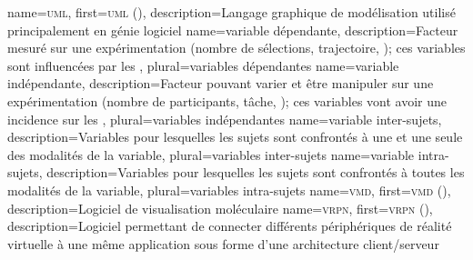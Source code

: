 %
{%
	name={\textsc{uml}},%
	first={\textsc{uml} ()},%
	description={Langage graphique de modélisation utilisé principalement en génie logiciel}%
}
%
{%
	name={variable dépendante},%
	description={Facteur mesuré sur une expérimentation (nombre de sélections, trajectoire, \myetc); ces variables sont influencées par les },%
	plural={variables dépendantes}%
}
%
{%
	name={variable indépendante},%
	description={Facteur pouvant varier et être manipuler sur une expérimentation (nombre de participants, tâche, \myetc); ces variables vont avoir une incidence sur les },%
	plural={variables indépendantes}%
}
%
{%
	name={variable inter-sujets},%
	description={Variables pour lesquelles les sujets sont confrontés à une et une seule des modalités de la variable},%
	plural={variables inter-sujets}%
}
%
{%
	name={variable intra-sujets},%
	description={Variables pour lesquelles les sujets sont confrontés à toutes les modalités de la variable},%
	plural={variables intra-sujets}%
}
%
{%
	name={\textsc{vmd}},%
	first={\textsc{vmd} ()},%
	description={Logiciel de visualisation moléculaire }%
}
%
{%
	name={\textsc{vrpn}},%
	first={\textsc{vrpn} ()},%
	description={Logiciel permettant de connecter différents périphériques de réalité virtuelle à une même application sous forme d'une architecture client/serveur }%
}

